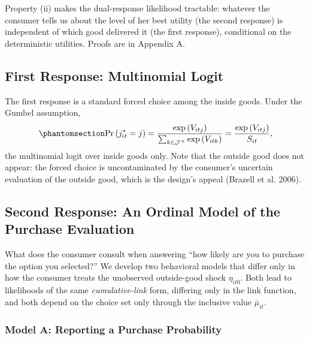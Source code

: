 \documentclass[
  letterpaper,
  DIV=11,
  numbers=noendperiod]{scrartcl}
\theoremstyle{plain}
\theoremstyle{plain}
\theoremstyle{remark}
\begin{document}
Property (ii) makes the dual-response likelihood tractable: whatever the
consumer tells us about the level of her best utility (the second
response) is independent of which good delivered it (the first
response), conditional on the deterministic utilities. Proofs are in
Appendix A.

\subsection{First Response: Multinomial
Logit}\label{first-response-multinomial-logit}

The first response is a standard forced choice among the inside goods.
Under the Gumbel assumption,
\begin{equation}\protect\phantomsection\label{eq-mnl}{
\Pr \left( j^*_{it} = j \right)
= \frac{\exp \left( V_{itj} \right)}{\sum_{k\in\mathcal{J}^{+}} \exp \left( V_{itk} \right)}
= \frac{\exp \left( V_{itj} \right)}{S_{it}},
}\end{equation} the multinomial logit over inside goods only. Note that
the outside good does not appear: the forced choice is uncontaminated by
the consumer's uncertain evaluation of the outside good, which is the
design's appeal (Brazell et al. 2006).

\subsection{Second Response: An Ordinal Model of the Purchase
Evaluation}\label{second-response-an-ordinal-model-of-the-purchase-evaluation}

What does the consumer consult when answering ``how likely are you to
purchase the option you selected?'' We develop two behavioral models
that differ only in how the consumer treats the unobserved outside-good
shock \(\eta_{it0}\). Both lead to likelihoods of the same
\emph{cumulative-link} form, differing only in the link function, and
both depend on the choice set only through the inclusive value
\(\overline{\mu}_{it}\).

\subsubsection{Model A: Reporting a Purchase
Probability}\label{sec-modelA}
\end{document}
